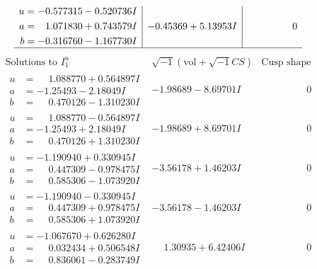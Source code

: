 \documentclass[1p]{elsarticle_modified}
\theoremstyle{definition}
\newcommand{\I}{\sqrt{-1}}
\begin{document}
$$\begin{array}{c|c|c}
\begin{aligned}
u &= -0.577315 - 0.520736 I \\
a &= \phantom{-}1.071830 + 0.743579 I \\
b &= -0.316760 - 1.167730 I\end{aligned}
 & -0.45369 + 5.13953 I & \phantom{-0.000000 } 0\\
 \hline 
 \end{array}$$\newpage$$\begin{array}{c|c|c}  
\text{Solutions to }I^u_{1}& \I (\text{vol} + \sqrt{-1}CS) & \text{Cusp shape}\\
 \hline 
\begin{aligned}
u &= \phantom{-}1.088770 + 0.564897 I \\
a &= -1.25493 - 2.18049 I \\
b &= \phantom{-}0.470126 - 1.310230 I\end{aligned}
 & -1.98689 - 8.69701 I & \phantom{-0.000000 } 0 \\ \hline\begin{aligned}
u &= \phantom{-}1.088770 - 0.564897 I \\
a &= -1.25493 + 2.18049 I \\
b &= \phantom{-}0.470126 + 1.310230 I\end{aligned}
 & -1.98689 + 8.69701 I & \phantom{-0.000000 } 0 \\ \hline\begin{aligned}
u &= -1.190940 + 0.330945 I \\
a &= \phantom{-}0.447309 - 0.978475 I \\
b &= \phantom{-}0.585306 - 1.073920 I\end{aligned}
 & -3.56178 + 1.46203 I & \phantom{-0.000000 } 0 \\ \hline\begin{aligned}
u &= -1.190940 - 0.330945 I \\
a &= \phantom{-}0.447309 + 0.978475 I \\
b &= \phantom{-}0.585306 + 1.073920 I\end{aligned}
 & -3.56178 - 1.46203 I & \phantom{-0.000000 } 0 \\ \hline\begin{aligned}
u &= -1.067670 + 0.626280 I \\
a &= \phantom{-}0.032434 + 0.506548 I \\
b &= \phantom{-}0.836061 - 0.283749 I\end{aligned}
 & \phantom{-}1.30935 + 6.42406 I & \phantom{-0.000000 } 0 \\ \hline\begin{aligned}

\end{aligned}
\end{array}$$
\end{document}
